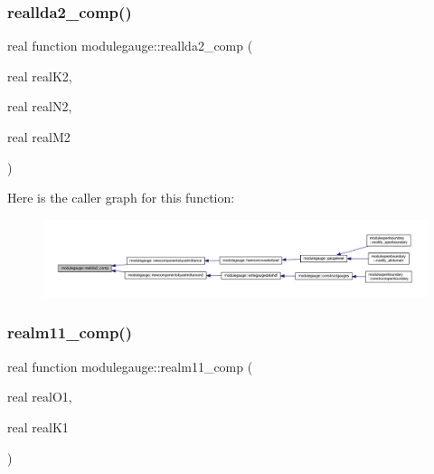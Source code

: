 \subsubsection{\texorpdfstring{reallda2\+\_\+comp()}{reallda2\_comp()}}
{\footnotesize\ttfamily real function modulegauge\+::reallda2\+\_\+comp (\begin{DoxyParamCaption}\item[{real}]{real\+K2,  }\item[{real}]{real\+N2,  }\item[{real}]{real\+M2 }\end{DoxyParamCaption})\hspace{0.3cm}{\ttfamily [private]}}

Here is the caller graph for this function\+:\nopagebreak
\begin{figure}[H]
\begin{center}
\leavevmode
\includegraphics[width=350pt]{namespacemodulegauge_aa12106b28d4813b546feb45a0408ffa0_icgraph}
\end{center}
\end{figure}
\mbox{\label{namespacemodulegauge_a50f7735172ff499a2539356846ac25a7}} 
\subsubsection{\texorpdfstring{realm11\+\_\+comp()}{realm11\_comp()}}
{\footnotesize\ttfamily real function modulegauge\+::realm11\+\_\+comp (\begin{DoxyParamCaption}\item[{real}]{real\+O1,  }\item[{real}]{real\+K1 }\end{DoxyParamCaption})\hspace{0.3cm}{\ttfamily [private]}}

\mbox{\label{namespacemodulegauge_ae46da4813d3e3f271dc78267bee39db6}} 
